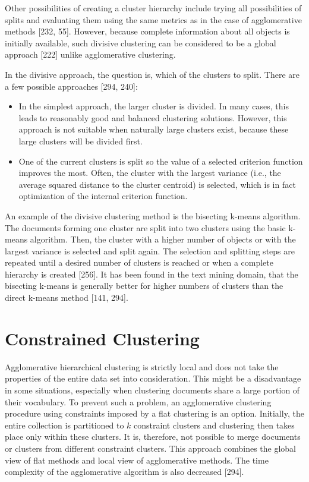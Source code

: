 \documentclass[11pt,openany,executivepaper]{book}
\begin{document}
Other possibilities of creating a cluster hierarchy include trying all possibilities of splits and evaluating them using the same metrics as in the case of agglomerative methods [232, 55]. However, because complete information about
all objects is initially available, such divisive clustering can be considered to be a global approach [222] unlike agglomerative clustering.

In the divisive approach, the question is, which of the clusters to split. There are a few possible approaches [294, 240]:
\begin{itemize}
\item In the simplest approach, the larger cluster is divided. In many cases, this
leads to reasonably good and balanced clustering solutions. However, this
approach is not suitable when naturally large clusters exist, because these
large clusters will be divided first.
\item One of the current clusters is split so the value of a selected criterion function improves the most. Often, the cluster with the largest variance (i.e.,
the average squared distance to the cluster centroid) is selected, which is
in fact optimization of the internal criterion function.

\end{itemize}

An example of the divisive clustering method is the bisecting k-means algorithm. The documents forming one cluster are split into two clusters using the basic k-means algorithm. Then, the cluster with a higher number of objects or with the largest variance is selected and split again. The selection and splitting steps are repeated until a desired number of clusters is reached or when a complete hierarchy is created [256]. It has been found in the text mining domain, that the bisecting k-means is generally better for higher numbers of clusters than the
direct k-means method [141, 294].

\section{Constrained Clustering}

Agglomerative hierarchical clustering is strictly local and does not take the properties of the entire data set into consideration. This might be a disadvantage in some situations, especially when clustering documents share a large portion of their vocabulary. To prevent such a problem, an agglomerative clustering procedure using constraints imposed by a flat clustering is an option. Initially, the entire collection is partitioned to $k$ constraint clusters and clustering then takes place only within these clusters. It is, therefore, not possible to merge documents or clusters from different constraint clusters. This approach combines the global view of flat methods and local view of agglomerative methods. The time complexity of the agglomerative algorithm is also decreased [294].
\end{document}
